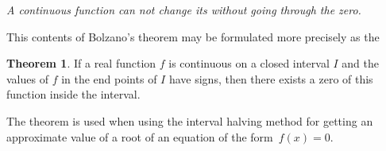 \documentclass[12pt]{article}
\theoremstyle{definition}
\newtheorem*{thmplain}{Theorem}
\begin{document}
{\em A continuous function can not change its  without going through the zero.}

This contents of Bolzano's theorem may be formulated more precisely as the
\begin{thmplain}
If a real function $f$ is continuous on a closed interval $I$ and the values of $f$ in the end points of $I$ have  signs, then there exists a zero of this function inside the interval.
\end{thmplain}

The theorem is used when using the interval halving method for getting an approximate value of a root of an equation of the form\, $f(x) = 0$.
\end{document}
